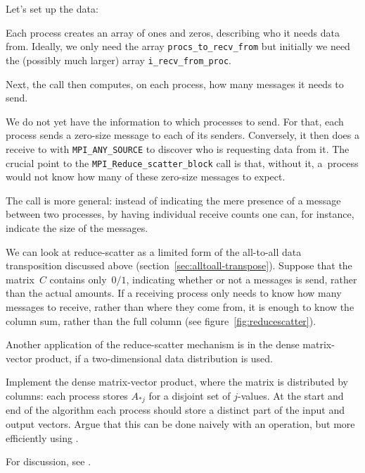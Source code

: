 Let's set up the data:
%

Each process creates an array of ones and zeros, describing who
it needs data from.
Ideally, we only need the array \lstinline+procs_to_recv_from+
but initially we need the (possibly much larger) array
\lstinline+i_recv_from_proc+.

Next, the  call then
computes, on each process, how many messages it needs to send.
%

We do not yet have the information to which processes to send.
For that, each process sends a zero-size message to
each of its senders.
Conversely, it then does a receive to with \lstinline+MPI_ANY_SOURCE+
to discover who is requesting data from it.
The crucial point to the \lstinline+MPI_Reduce_scatter_block+ call
is that, without it, a~process would not know how many
of these zero-size messages to expect.


The  call is more general:
instead of indicating the mere presence of a message
between two processes,
by having individual receive counts one can, for instance,
indicate the size of the messages.

We can look at reduce-scatter as a limited form of the all-to-all data
transposition discussed above (section~\ref{sec:alltoall-transpose}).
Suppose that the matrix~$C$ contains only~$0/1$, indicating
whether or not a messages is send, rather than the actual amounts.
If a receiving process only needs to know how many messages to
receive, rather than where they come from, it is enough to know the
column sum, rather than the full column (see figure~\ref{fig:reducescatter}).

Another application of the reduce-scatter mechanism is in the
dense matrix-vector product, if a two-dimensional data distribution
is used.

\begin{exercise}
  \label{ex:mpi-mvp-bycol}
  Implement the dense matrix-vector product, where the matrix is distributed by columns:
  each process stores $A_{*j}$ for a disjoint set of $j$-values.
  At the start and end of the algorithm each process should store a
  distinct part of the input and output vectors.
  Argue that this can be done naively with an  operation,
  but more efficiently using .
  
  For discussion, see .
\end{exercise}

